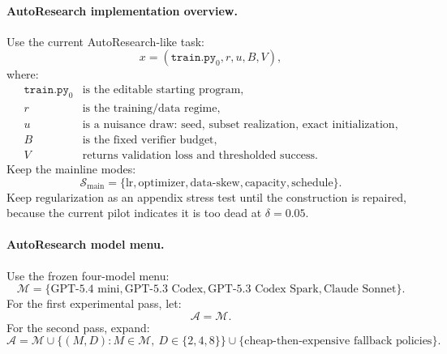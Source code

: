 \documentclass{article}
\begin{document}
\paragraph{AutoResearch implementation overview.}
Use the current AutoResearch-like task:
\[
    x=(\texttt{train.py}_0,r,u,B,V),
\]
where:
\[
\begin{array}{ll}
    \texttt{train.py}_0 & \text{is the editable starting program},\\
    r & \text{is the training/data regime},\\
    u & \text{is a nuisance draw: seed, subset realization, exact initialization},\\
    B & \text{is the fixed verifier budget},\\
    V & \text{returns validation loss and thresholded success}.
\end{array}
\]
Keep the mainline modes:
\[
    \mathcal S_{\mathrm{main}}
    =
    \{
    \mathrm{lr},
    \mathrm{optimizer},
    \mathrm{data\text{-}skew},
    \mathrm{capacity},
    \mathrm{schedule}
    \}.
\]
Keep \(\mathrm{regularization}\) as an appendix stress test until the construction is repaired,
because the current pilot indicates it is too dead at \(\delta=0.05\).

\paragraph{AutoResearch model menu.}
Use the frozen four-model menu:
\[
    \mathcal M
    =
    \{
    \text{GPT-5.4 mini},
    \text{GPT-5.3 Codex},
    \text{GPT-5.3 Codex Spark},
    \text{Claude Sonnet}
    \}.
\]
For the first experimental pass, let:
\[
    \mathcal A=\mathcal M.
\]
For the second pass, expand:
\[
    \mathcal A
    =
    \mathcal M
    \cup
    \{(M,D):M\in\mathcal M,\ D\in\{2,4,8\}\}
    \cup
    \{\text{cheap-then-expensive fallback policies}\}.
\]
\end{document}
